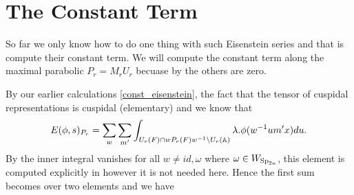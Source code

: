 \begin{comment}
    \section{Our Results}
We consider an almost identical setup but we deal with the metaplectic cover of \(\Sp_{2n}\), again over a number field \(F\), \(\Mp_{2n}\)\todo[inline]{reference the section I discuss this in.}. We again fix the Borel of upper triangular matricies, consider partitions of \(n = r+m\) and look at maximal standard parabolics of \(\Sp_{2n}\), \(P_r = M_rN_r\) such that 
\[M_r = \GL_r \times \Sp_{2m}\]
then if \(r = ab\) we still have that \(\Delta(\tau, b)\tensor \sigma\), for \(\tau\) irreducible unitary cuspidal automorphic representation of \(\GL_a\) and \(\sigma\) irreducible generic cuspidal automorphic representation of \(\Sp_{2m}\), is a representation of \(M_r\). The difference is in the parabolic induction as we now consider 
\[\phi\in \mathcal{A}(N_r(\A)M_r(F)\setminus \Mp_{2n}(\A) )_{\Delta(\tau, b)\tensor \sigma}\] 
and then the Eisenstein series is defined in the same way
\[E(\phi, s)(g) = \sum_{\gamma\in P_r(F) \setminus \Sp_{2n}(F)} s.\phi(\gamma g)\]
for \(g\in \Sp_{2n}(F) \setminus \Mp_{2n}(\A)\) and \(s\in \C \cong X^{\Mp_{2n}}_{M_r}\).

\begin{Lemma}
When \(b = 1\) we have the constant term
    \[E(\phi,s)(g)_{P_a} = \phi(g)_{P_a} + M(\omega, \tau\tensor\sigma)(\phi)(g)\]
\end{Lemma}

\todo[inline]{fill in here as theorems or whatever anything that I end up actually checking....}

\end{comment}


\section{The Constant Term}
So far we only know how to do one thing with such Eisenstein series and that is compute their constant term. We will compute the constant term along the maximal parabolic \(P_r = M_rU_r\) becuase by \cite[II.1.7 (ii)]{moeglinSpectralDecompositionEisenstein1995} the others are zero.

By our earlier calculations \ref{const_eisenstein}, the fact that the tensor of cuspidal representations is cuspidal (elementary) and \cite{jiangPolesCertainResidual2013} we know that 
     \[E(\phi, s)_{P_r} = \sum_{ w} \sum_{m'} \int_{U_r(F)\cap wP_r(F)w\inv \setminus U_r(\A)} \lambda.\phi( w\inv um' x)  du.\] 
     By \cite{jiangPolesCertainResidual2013} the inner integral vanishes for all \(w\neq id, \omega\) where \(\omega\in W_{\operatorname{Sp}_{2n}}\), this element is computed explicitly in \cite{ginzburgDescentMapAutomorphic2011} however it is not needed here. Hence the first sum becomes over two elements and we have 

